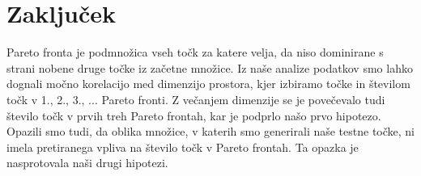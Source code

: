 \documentclass{article}
\begin{document}
\section{Zaključek}
Pareto fronta je podmnožica vseh točk za katere velja, da niso dominirane s strani nobene druge točke iz začetne množice. Iz naše analize podatkov smo lahko dognali močno korelacijo med dimenzijo prostora, kjer izbiramo točke in številom točk v 1., 2., 3., ... Pareto fronti. Z večanjem dimenzije se je povečevalo tudi število točk v prvih treh Pareto frontah, kar je podprlo našo prvo hipotezo. Opazili smo tudi, da oblika množice, v katerih smo generirali naše testne točke, ni imela pretiranega vpliva na število točk v Pareto frontah. Ta opazka je nasprotovala naši drugi hipotezi.
\end{document}
